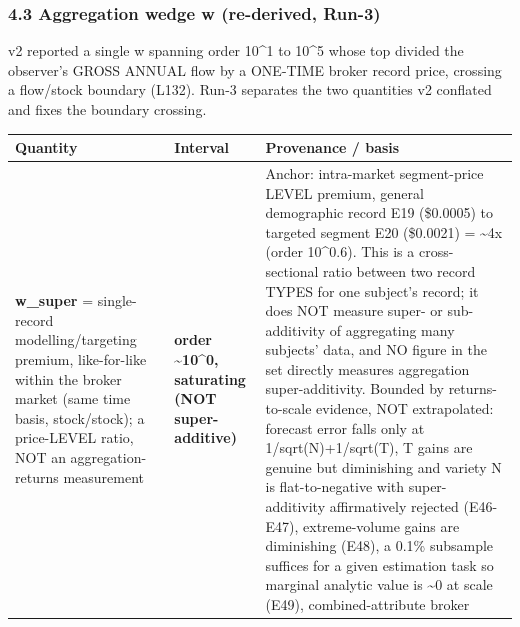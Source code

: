 \documentclass[
  11pt,
]{article}
\newcounter{none} %
\begin{document}
\subsubsection{4.3 Aggregation wedge w (re-derived,
Run-3)}\label{aggregation-wedge-w-re-derived-run-3}

v2 reported a single w spanning order 10\^{}1 to 10\^{}5 whose top
divided the observer's GROSS ANNUAL flow by a ONE-TIME broker record
price, crossing a flow/stock boundary (L132). Run-3 separates the two
quantities v2 conflated and fixes the boundary crossing.

{\def\LTcaptype{none} %
\begin{longtable}[]{@{}
  >{\raggedright\arraybackslash}p{}
  >{\raggedright\arraybackslash}p{}
  >{\raggedright\arraybackslash}p{}@{}}
\toprule\noalign{}
\begin{minipage}[b]{\linewidth}\raggedright
Quantity
\end{minipage} & \begin{minipage}[b]{\linewidth}\raggedright
Interval
\end{minipage} & \begin{minipage}[b]{\linewidth}\raggedright
Provenance / basis
\end{minipage} \\
\midrule\noalign{}
\endhead
\bottomrule\noalign{}
\endlastfoot
\textbf{w\_super} = single-record modelling/targeting premium,
like-for-like within the broker market (same time basis, stock/stock); a
price-LEVEL ratio, NOT an aggregation-returns measurement &
\textbf{order \textasciitilde10\^{}0, saturating (NOT super-additive)} &
Anchor: intra-market segment-price LEVEL premium, general demographic
record E19 (\$0.0005) to targeted segment E20 (\$0.0021) =
\textasciitilde4x (order 10\^{}0.6). This is a cross-sectional ratio
between two record TYPES for one subject's record; it does NOT measure
super- or sub-additivity of aggregating many subjects' data, and NO
figure in the set directly measures aggregation super-additivity.
Bounded by returns-to-scale evidence, NOT extrapolated: forecast error
falls only at 1/sqrt(N)+1/sqrt(T), T gains are genuine but diminishing
and variety N is flat-to-negative with super-additivity affirmatively
rejected (E46-E47), extreme-volume gains are diminishing (E48), a 0.1\%
subsample suffices for a given estimation task so marginal analytic
value is \textasciitilde0 at scale (E49), combined-attribute broker

\end{longtable}}
\end{document}
